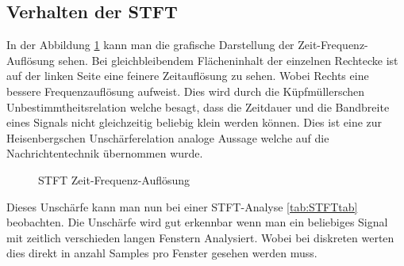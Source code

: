 \subsection{Verhalten der STFT}
In der Abbildung \ref{fig:stftauf} kann man die grafische Darstellung der Zeit-Frequenz-Auflösung sehen. Bei gleichbleibendem Flächeninhalt der einzelnen Rechtecke ist auf der linken Seite eine feinere Zeitauflösung zu sehen. Wobei Rechts eine bessere Frequenzauflösung aufweist. Dies wird durch die Küpfmüllerschen Unbestimmtheitsrelation welche besagt, dass die Zeitdauer und die Bandbreite eines Signals nicht gleichzeitig beliebig klein werden können. Dies ist eine zur Heisenbergschen Unschärferelation analoge Aussage welche auf die Nachrichtentechnik übernommen wurde.

\begin{figure}[!ht]
	\centering
	\caption{STFT Zeit-Frequenz-Auflösung}\label{fig:stftauf}
	
\end{figure}

Dieses Unschärfe kann man nun bei einer STFT-Analyse \ref{tab:STFTtab} beobachten. Die Unschärfe wird gut erkennbar wenn man ein beliebiges Signal mit zeitlich verschieden langen Fenstern Analysiert. Wobei bei diskreten werten dies direkt in anzahl Samples pro Fenster gesehen werden muss.\\
 
